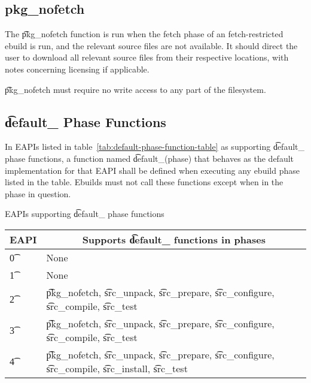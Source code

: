 \subsection{pkg\_nofetch}
\label{sec:pkg-nofetch-function}

The \t{pkg\_nofetch} function is run when the fetch phase of an fetch-restricted ebuild is run, and
the relevant source files are not available. It should direct the user to download all relevant
source files from their respective locations, with notes concerning licensing if applicable.

\t{pkg\_nofetch} must require no write access to any part of the filesystem.

\subsection{\t{default\_} Phase Functions}
\label{sec:default-phase-funcs}

 In EAPIs listed in
table~\ref{tab:default-phase-function-table} as supporting \t{default\_} phase functions, a function
named \t{default\_}(phase) that behaves as the default implementation for that EAPI shall be defined
when executing any ebuild phase listed in the table. Ebuilds must not call these functions except
when in the phase in question.

\begin{centertable}{EAPIs supporting \t{default\_} phase functions} \label{tab:default-phase-function-table}
    \begin{tabular}{ l l }
        \toprule
            \multicolumn{1}{c}{\textbf{EAPI}} &
            \multicolumn{1}{c}{\textbf{Supports \t{default\_} functions in phases}} \\
            \midrule
    \t{0} & None \\
    \t{1} & None \\
    \t{2} & \parbox[t]{3in}{\t{pkg\_nofetch}, \t{src\_unpack}, \t{src\_prepare}, \t{src\_configure},
        \t{src\_compile}, \t{src\_test}} \\
    \t{3} & \parbox[t]{3in}{\t{pkg\_nofetch}, \t{src\_unpack}, \t{src\_prepare}, \t{src\_configure},
        \t{src\_compile}, \t{src\_test}} \\
    \t{4} & \parbox[t]{3in}{\t{pkg\_nofetch}, \t{src\_unpack}, \t{src\_prepare}, \t{src\_configure},
        \t{src\_compile}, \t{src\_install}, \t{src\_test}} \\
    \bottomrule
    \end{tabular}
\end{centertable}

